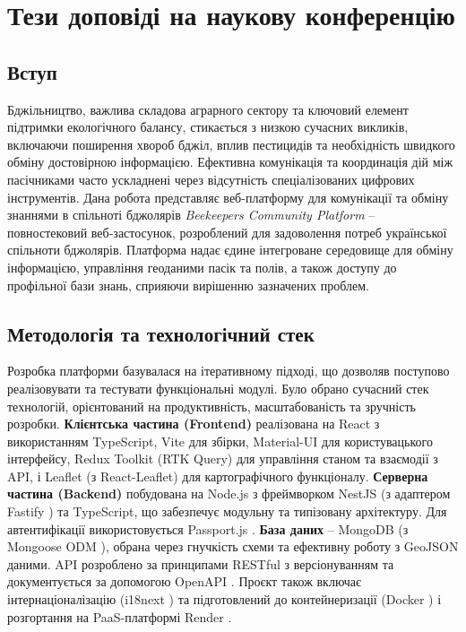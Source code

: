 \section*{Тези доповіді на наукову конференцію}
\label{sec:conference_abstract}

\subsection*{Вступ}
Бджільництво, важлива складова аграрного сектору та ключовий елемент підтримки екологічного балансу, стикається з низкою сучасних викликів, включаючи поширення хвороб бджіл, вплив пестицидів та необхідність швидкого обміну достовірною інформацією. Ефективна комунікація та координація дій між пасічниками часто ускладнені через відсутність спеціалізованих цифрових інструментів. Дана робота представляє веб-платформу для комунікації та обміну знаннями в спільноті бджолярів \textit{Beekeepers Community Platform} – повностековий веб-застосунок, розроблений для задоволення потреб української спільноти бджолярів. Платформа надає єдине інтегроване середовище для обміну інформацією, управління геоданими пасік та полів, а також доступу до профільної бази знань, сприяючи вирішенню зазначених проблем.

\subsection*{Методологія та технологічний стек}
Розробка платформи базувалася на ітеративному підході, що дозволяв поступово реалізовувати та тестувати функціональні модулі. Було обрано сучасний стек технологій, орієнтований на продуктивність, масштабованість та зручність розробки. 
\textbf{Клієнтська частина (Frontend)} реалізована на React \cite{react} з використанням TypeScript, Vite \cite{vite} для збірки, Material-UI \cite{materialui} для користувацького інтерфейсу, Redux Toolkit (RTK Query) \cite{reduxtoolkit} для управління станом та взаємодії з API, і Leaflet \cite{leaflet} (з React-Leaflet) для картографічного функціоналу. 
\textbf{Серверна частина (Backend)} побудована на Node.js з фреймворком NestJS \cite{nestjs} (з адаптером Fastify \cite{fastify}) та TypeScript, що забезпечує модульну та типізовану архітектуру. Для автентифікації використовується Passport.js \cite{passportjs}.
\textbf{База даних} – MongoDB \cite{mongodb} (з Mongoose ODM \cite{mongoose}), обрана через гнучкість схеми та ефективну роботу з GeoJSON даними.
API розроблено за принципами RESTful з версіонуванням та документується за допомогою OpenAPI \cite{openapi}. Проєкт також включає інтернаціоналізацію (i18next \cite{i18next}) та підготовлений до контейнеризації (Docker \cite{docker}) і розгортання на PaaS-платформі Render \cite{renderpaas}.


